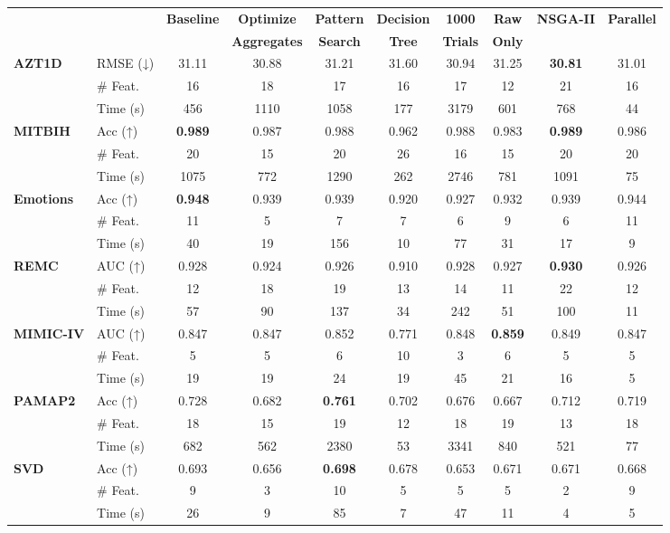 \label{tab:ablation}
\tiny
\setlength{\tabcolsep}{0.5pt}
\renewcommand{\arraystretch}{0.85}
\begin{tabular*}{\textwidth}{@{\extracolsep{\fill}}llcccccccc@{}}
\toprule
 &  & \textbf{Baseline} & \textbf{Optimize} & \textbf{Pattern} & \textbf{Decision} & \textbf{1000} & \textbf{Raw} & \textbf{NSGA-II} & \textbf{Parallel} \\
 &  & \textbf{} & \textbf{Aggregates} & \textbf{Search} & \textbf{Tree} & \textbf{Trials} & \textbf{Only} & \textbf{} & \textbf{} \\
\midrule
\multirow{3}{*}{\textbf{AZT1D}} & RMSE (↓) & 31.11 & 30.88 & 31.21 & 31.60 & 30.94 & 31.25 & \textbf{30.81} & 31.01 \\
 & \# Feat. & 16 & 18 & 17 & 16 & 17 & 12 & 21 & 16 \\
 & Time (s) & 456 & 1110 & 1058 & 177 & 3179 & 601 & 768 & 44 \\
\midrule
\multirow{3}{*}{\textbf{MITBIH}} & Acc (↑) & \textbf{0.989} & 0.987 & 0.988 & 0.962 & 0.988 & 0.983 & \textbf{0.989} & 0.986 \\
 & \# Feat. & 20 & 15 & 20 & 26 & 16 & 15 & 20 & 20 \\
 & Time (s) & 1075 & 772 & 1290 & 262 & 2746 & 781 & 1091 & 75 \\
\midrule
\multirow{3}{*}{\textbf{Emotions}} & Acc (↑) & \textbf{0.948} & 0.939 & 0.939 & 0.920 & 0.927 & 0.932 & 0.939 & 0.944 \\
 & \# Feat. & 11 & 5 & 7 & 7 & 6 & 9 & 6 & 11 \\
 & Time (s) & 40 & 19 & 156 & 10 & 77 & 31 & 17 & 9 \\
\midrule
\multirow{3}{*}{\textbf{REMC}} & AUC (↑) & 0.928 & 0.924 & 0.926 & 0.910 & 0.928 & 0.927 & \textbf{0.930} & 0.926 \\
 & \# Feat. & 12 & 18 & 19 & 13 & 14 & 11 & 22 & 12 \\
 & Time (s) & 57 & 90 & 137 & 34 & 242 & 51 & 100 & 11 \\
\midrule
\multirow{3}{*}{\textbf{MIMIC-IV}} & AUC (↑) & 0.847 & 0.847 & 0.852 & 0.771 & 0.848 & \textbf{0.859} & 0.849 & 0.847 \\
 & \# Feat. & 5 & 5 & 6 & 10 & 3 & 6 & 5 & 5 \\
 & Time (s) & 19 & 19 & 24 & 19 & 45 & 21 & 16 & 5 \\
\midrule
\multirow{3}{*}{\textbf{PAMAP2}} & Acc (↑) & 0.728 & 0.682 & \textbf{0.761} & 0.702 & 0.676 & 0.667 & 0.712 & 0.719 \\
 & \# Feat. & 18 & 15 & 19 & 12 & 18 & 19 & 13 & 18 \\
 & Time (s) & 682 & 562 & 2380 & 53 & 3341 & 840 & 521 & 77 \\
\midrule
\multirow{3}{*}{\textbf{SVD}} & Acc (↑) & 0.693 & 0.656 & \textbf{0.698} & 0.678 & 0.653 & 0.671 & 0.671 & 0.668 \\
 & \# Feat. & 9 & 3 & 10 & 5 & 5 & 5 & 2 & 9 \\
 & Time (s) & 26 & 9 & 85 & 7 & 47 & 11 & 4 & 5 \\
\bottomrule
\end{tabular*}
